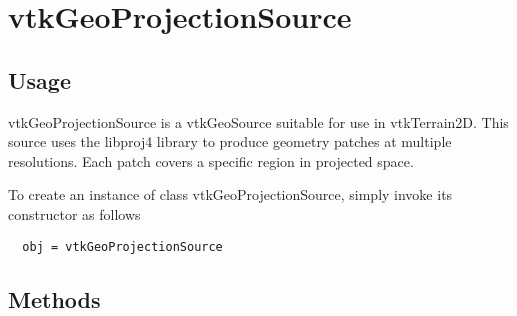 \section{vtkGeoProjectionSource}

\subsection{Usage}

 vtkGeoProjectionSource is a vtkGeoSource suitable for use in vtkTerrain2D.
 This source uses the libproj4 library to produce geometry patches at
 multiple resolutions. Each patch covers a specific region in projected
 space.

To create an instance of class vtkGeoProjectionSource, simply
invoke its constructor as follows
\begin{verbatim}
  obj = vtkGeoProjectionSource
\end{verbatim}
\subsection{Methods}


